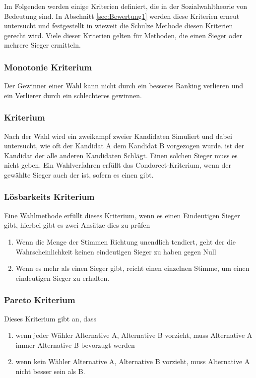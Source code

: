 Im Folgenden werden einige Kriterien definiert, die in der Sozialwahltheorie von Bedeutung sind. In Abschnitt \ref{sec:Bewertung1} werden diese Kriterien erneut untersucht und festgestellt in wieweit die Schulze Methode diesen Kriterien gerecht wird. Viele dieser Kriterien gelten für Methoden, die einen Sieger oder mehrere Sieger ermitteln. 

\subsubsection{Monotonie Kriterium} 
\label{sec:monotoniekriterium}
Der Gewinner einer Wahl kann nicht durch ein besseres Ranking verlieren und ein Verlierer durch ein schlechteres gewinnen. \citep{Woodall1996}

\subsubsection{\condorcet Kriterium} 
\label{sec:condorectKriterium}
Nach der Wahl wird ein zweikampf zweier Kandidaten Simuliert und dabei untersucht, wie oft der Kandidat A dem Kandidat B vorgezogen wurde. \condorcetSieger ist der Kandidat der alle anderen Kandidaten Schlägt. Einen solchen Sieger muss es nicht geben. Ein Wahlverfahren erfüllt das Condorect-Kriterium, wenn der gewählte Sieger auch der \condorcetSieger ist, sofern es einen \condorcetSieger gibt. \citep{Johnson2005}

\subsubsection{Lösbarkeits Kriterium} 
\label{sec:loesbarkeitsKriterium}
Eine Wahlmethode erfüllt dieses Kriterium, wenn es einen Eindeutigen Sieger gibt, hierbei gibt es zwei Ansätze dies zu prüfen \citep{Schulze2017}
\begin{enumerate}
\item Wenn die Menge der Stimmen Richtung unendlich tendiert, geht der die Wahrscheinlichkeit keinen eindeutigen Sieger zu haben gegen Null 
\item Wenn es mehr als einen Sieger gibt, reicht einen einzelnen Stimme, um einen eindeutigen Sieger zu erhalten.
\end{enumerate}

\subsubsection{Pareto Kriterium} 
\label{sec:paretoKriterium}
Dieses Kriterium gibt an, dass
\begin{enumerate}
\item wenn jeder Wähler Alternative A, Alternative B vorzieht, muss Alternative A immer Alternative B bevorzugt werden
\item wenn kein Wähler Alternative A, Alternative B vorzieht, muss Alternative A nicht besser sein als B. \citep{Schulze2017}
\end{enumerate}

